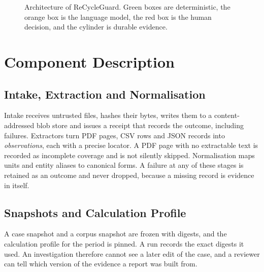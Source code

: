 \begin{figure}[H]
{}
\caption{Architecture of ReCycleGuard. Green boxes are deterministic, the orange box is the language
model, the red box is the human decision, and the cylinder is durable evidence.}
\label{fig:arch}
\end{figure}

\section{Component Description}

\subsection{Intake, Extraction and Normalisation}
Intake receives untrusted files, hashes their bytes, writes them to a content-addressed blob store and
issues a receipt that records the outcome, including failures. Extractors turn PDF pages, CSV rows and JSON
records into \emph{observations}, each with a precise locator. A PDF page with no extractable text is
recorded as incomplete coverage and is not silently skipped. Normalisation maps units and entity aliases to
canonical forms. A failure at any of these stages is retained as an outcome and never dropped, because
a missing record is evidence in itself.

\subsection{Snapshots and Calculation Profile}
A case snapshot and a corpus snapshot are frozen with digests, and the calculation profile for the period is
pinned. A run records the exact digests it used. An investigation therefore cannot see a later edit of the
case, and a reviewer can tell which version of the evidence a report was built from.

